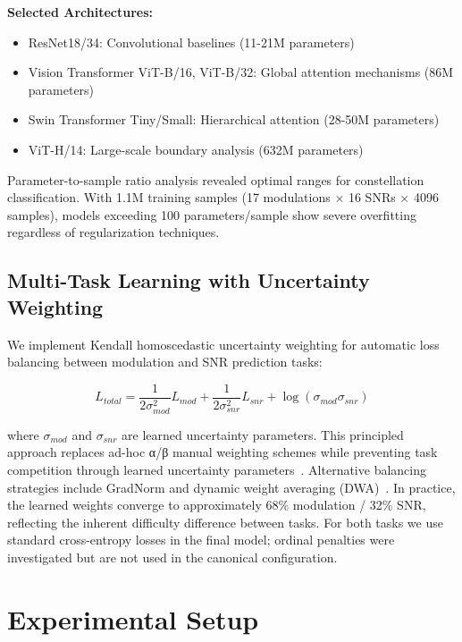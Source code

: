 \documentclass{ELSP}
\begin{document}
\textbf{Selected Architectures:}
\begin{itemize}
    \item ResNet18/34: Convolutional baselines (11-21M parameters)
    \item Vision Transformer ViT-B/16, ViT-B/32: Global attention mechanisms (86M parameters)
    \item Swin Transformer Tiny/Small: Hierarchical attention (28-50M parameters)
    \item ViT-H/14: Large-scale boundary analysis (632M parameters)
\end{itemize}

Parameter-to-sample ratio analysis revealed optimal ranges for constellation classification. With 1.1M training samples (17 modulations × 16 SNRs × 4096 samples), models exceeding 100 parameters/sample show severe overfitting regardless of regularization techniques.

\subsection{Multi-Task Learning with Uncertainty Weighting}

We implement Kendall homoscedastic uncertainty weighting for automatic loss balancing between modulation and SNR prediction tasks:

\begin{equation}
L_{total} = \frac{1}{2\sigma_{mod}^2} L_{mod} + \frac{1}{2\sigma_{snr}^2} L_{snr} + \log(\sigma_{mod}\sigma_{snr})
\end{equation}

where $\sigma_{mod}$ and $\sigma_{snr}$ are learned uncertainty parameters. This principled approach replaces ad-hoc α/β manual weighting schemes while preventing task competition through learned uncertainty parameters~\cite{kendall2018multitask}. Alternative balancing strategies include GradNorm and dynamic weight averaging (DWA)~\cite{chen2018gradnorm,liu2019dwa}. In practice, the learned weights converge to approximately 68\% modulation / 32\% SNR, reflecting the inherent difficulty difference between tasks.
For both tasks we use standard cross-entropy losses in the final model; ordinal penalties were investigated but are not used in the canonical configuration.

\section{Experimental Setup}
\end{document}
